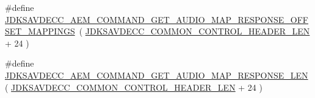 \begin{DoxyCompactItemize}
\item 
\#define \hyperlink{group__command__get__audio__map__response_ga324ea76914e2ada08f9d0309b0578a95}{J\+D\+K\+S\+A\+V\+D\+E\+C\+C\+\_\+\+A\+E\+M\+\_\+\+C\+O\+M\+M\+A\+N\+D\+\_\+\+G\+E\+T\+\_\+\+A\+U\+D\+I\+O\+\_\+\+M\+A\+P\+\_\+\+R\+E\+S\+P\+O\+N\+S\+E\+\_\+\+O\+F\+F\+S\+E\+T\+\_\+\+M\+A\+P\+P\+I\+N\+GS}~( \hyperlink{group__jdksavdecc__avtp__common__control__header_gaae84052886fb1bb42f3bc5f85b741dff}{J\+D\+K\+S\+A\+V\+D\+E\+C\+C\+\_\+\+C\+O\+M\+M\+O\+N\+\_\+\+C\+O\+N\+T\+R\+O\+L\+\_\+\+H\+E\+A\+D\+E\+R\+\_\+\+L\+EN} + 24 )
\item 
\#define \hyperlink{group__command__get__audio__map__response_gaadc64bc783a27fb25775c7ffd1416a0f}{J\+D\+K\+S\+A\+V\+D\+E\+C\+C\+\_\+\+A\+E\+M\+\_\+\+C\+O\+M\+M\+A\+N\+D\+\_\+\+G\+E\+T\+\_\+\+A\+U\+D\+I\+O\+\_\+\+M\+A\+P\+\_\+\+R\+E\+S\+P\+O\+N\+S\+E\+\_\+\+L\+EN}~( \hyperlink{group__jdksavdecc__avtp__common__control__header_gaae84052886fb1bb42f3bc5f85b741dff}{J\+D\+K\+S\+A\+V\+D\+E\+C\+C\+\_\+\+C\+O\+M\+M\+O\+N\+\_\+\+C\+O\+N\+T\+R\+O\+L\+\_\+\+H\+E\+A\+D\+E\+R\+\_\+\+L\+EN} + 24 )
\end{DoxyCompactItemize}
